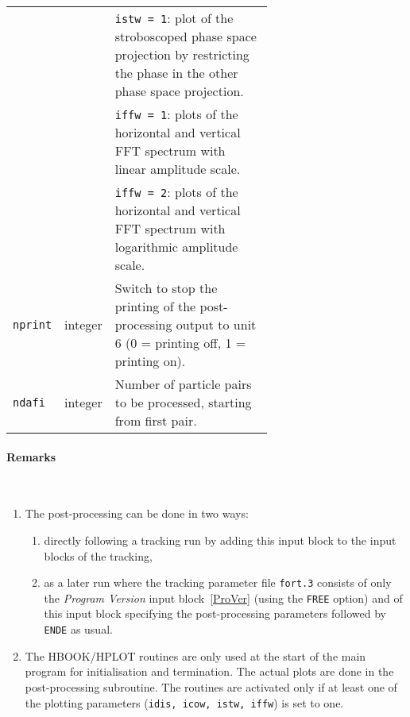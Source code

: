 \begin{longtabu}{@{}llp{0.65\linewidth}}
                          &          & \texttt{istw = 1}: plot of the stroboscoped phase space projection by restricting the phase in the other phase space projection. \\
                          &          & \texttt{iffw = 1}: plots of the horizontal and vertical FFT spectrum with linear amplitude scale. \\
                          &          & \texttt{iffw = 2}: plots of the horizontal and vertical FFT spectrum with logarithmic amplitude scale. \\
    \texttt{nprint}       & integer  & Switch to stop the printing of the post-processing output to unit 6 (0 = printing off, 1 = printing on). \\
    \texttt{ndafi}        & integer  & Number of particle pairs to be processed, starting from first pair.
\end{longtabu}

\paragraph{Remarks}~
\begin{enumerate}
    \item The post-processing can be done in two ways:
    \begin{enumerate}
        \item directly following a tracking run by adding this input block to the input blocks of the tracking,
        \item as a later run where the tracking parameter file \texttt{fort.3} consists of only the \textit{Program Version} input   block~\ref{ProVer} (using the \texttt{FREE} option) and of this input block specifying the post-processing parameters followed by \texttt{ENDE} as usual.
    \end{enumerate}
    \item The HBOOK/HPLOT routines are only used at the start of the main program for initialisation and termination. The actual plots are done in the post-processing subroutine. The routines are activated only if at least one of the plotting parameters (\texttt{idis, icow, istw, iffw}) is set to one.
\end{enumerate}

